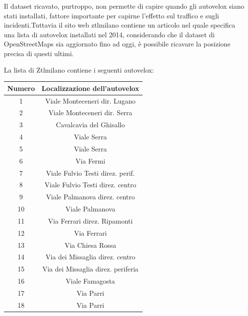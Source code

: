 \documentclass[a4paper]{report}
\begin{document}


Il dataset ricavato, purtroppo, non permette di capire quando gli autovelox siano 
stati installati, fattore importante per capirne l'effetto sul traffico e 
sugli incidenti.Tuttavia il sito web ztlmilano \cite{ZTLMILANO:1}
contiene un articolo nel quale specifica una lista di 
autovelox installati nel 2014, considerando che il dataset di OpenStreetMaps 
sia aggiornato fino ad oggi, è possibile ricavare la posizione precisa di 
questi ultimi.

La lista di Ztlmilano contiene i seguenti autovelox: 

\begin{center}
    \def\arraystretch{1.5}%
    \begin{tabular}{ |c|c| } 
    \hline
    Numero & Localizzazione dell'autovelox \\ 
    \hline
    \rowcolor{TableGray}
    1   &   Viale Monteceneri  dir. Lugano\\
    2   &   Viale Monteceneri dir. Serra\\
    \rowcolor{TableGray}
    3   &   Cavalcavia del Ghisallo\\
    4   &   Viale Serra \\
    \rowcolor{TableGray}
    5   &   Viale Serra\\
    6   &   Via Fermi\\
    \rowcolor{TableGray}
    7   &   Viale Fulvio Testi direz. perif.\\
    8   &   Viale Fulvio Testi direz. centro\\
    \rowcolor{TableGray}
    9   &   Viale Palmanova  direz. centro\\
    10  &   Viale Palmanova\\
    \rowcolor{TableGray}
    11  &   Via Ferrari direz. Ripamonti\\
    12  &   Via Ferrari\\
    \rowcolor{TableGray}
    13  &   Via Chiesa Rossa\\
    14  &   Via dei Missaglia direz. centro\\
    \rowcolor{TableGray}
    15  &   Via dei Missaglia direz. periferia\\
    16  &   Viale Famagosta\\
    \rowcolor{TableGray}
    17  &   Via Parri\\
    18  &   Via Parri\\
    \hline
    \end{tabular}
    \label{ztl-milano}
\end{center}
\end{document}

